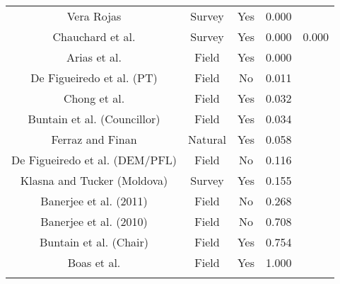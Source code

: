 \begin{table}[!htbp]
\begin{tabular}{@{\extracolsep{5pt}} ccccc}
Vera Rojas & Survey & Yes & 0.000 &  \\ 
Chauchard et al. & Survey & Yes & 0.000 & 0.000 \\ 
Arias et al. & Field & Yes & 0.000 &  \\ 
De Figueiredo et al. (PT) & Field & No & 0.011 &  \\ 
Chong et al. & Field & Yes & 0.032 &  \\ 
Buntain et al. (Councillor) & Field & Yes & 0.034 &  \\ 
Ferraz and Finan & Natural & Yes & 0.058 &  \\ 
De Figueiredo et al. (DEM/PFL) & Field & No & 0.116 &  \\ 
Klasna and Tucker (Moldova) & Survey & Yes & 0.155 &  \\ 
Banerjee et al. (2011) & Field & No & 0.268 &  \\ 
Banerjee et al. (2010) & Field & No & 0.708 &  \\ 
Buntain et al. (Chair) & Field & Yes & 0.754 &  \\ 
Boas et al. & Field & Yes & 1.000 &  \\ 
\hline \\[-1.8ex] 
\end{tabular} 
\end{table} 
